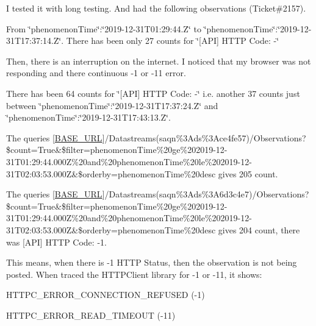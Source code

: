 \begin{DoxyEnumerate}
\item I tested it with long testing. And had the following observations (Ticket\#2157).
\begin{DoxyItemize}
\item From \char`\"{}phenomenon\+Time\char`\"{}\+:\char`\"{}2019-\/12-\/31\+T01\+:29\+:44.\+Z\char`\"{} to \char`\"{}phenomenon\+Time\char`\"{}\+:\char`\"{}2019-\/12-\/31\+T17\+:37\+:14.\+Z\char`\"{}. There has been only 27 counts for \char`\"{}\mbox{[}\+A\+P\+I\mbox{]} H\+T\+T\+P Code\+: -\/\char`\"{}
\item Then, there is an interruption on the internet. I noticed that my browser was not responding and there continuous -\/1 or -\/11 error.
\item There has been 64 counts for \char`\"{}\mbox{[}\+A\+P\+I\mbox{]} H\+T\+T\+P Code\+: -\/\char`\"{} i.\+e. another 37 counts just between \char`\"{}phenomenon\+Time\char`\"{}\+:\char`\"{}2019-\/12-\/31\+T17\+:37\+:24.\+Z\char`\"{} and \char`\"{}phenomenon\+Time\char`\"{}\+:\char`\"{}2019-\/12-\/31\+T17\+:43\+:13.\+Z\char`\"{}.
\item The queries \mbox{[}\mbox{\hyperlink{main_8h_acbb11c1e34784cf1e3147029f942bfd6}{B\+A\+S\+E\+\_\+\+U\+RL}}\mbox{]}/\+Datastreams(\textquotesingle{}saqn\%3Ads\%3Ace4fe57\textquotesingle{})/\+Observations?\$count=True\&\$filter=phenomenon\+Time\%20ge\%202019-\/12-\/31T01\+:29\+:44.\+000Z\%20and\%20phenomenon\+Time\%20le\%202019-\/12-\/31T02\+:03\+:53.\+000Z\&\$orderby=phenomenon\+Time\%20desc gives 205 count.
\item The queries \mbox{[}\mbox{\hyperlink{main_8h_acbb11c1e34784cf1e3147029f942bfd6}{B\+A\+S\+E\+\_\+\+U\+RL}}\mbox{]}/\+Datastreams(\textquotesingle{}saqn\%3Ads\%3A6d3c4e7\textquotesingle{})/\+Observations?\$count=True\&\$filter=phenomenon\+Time\%20ge\%202019-\/12-\/31T01\+:29\+:44.\+000Z\%20and\%20phenomenon\+Time\%20le\%202019-\/12-\/31T02\+:03\+:53.\+000Z\&\$orderby=phenomenon\+Time\%20desc gives 204 count, there was \mbox{[}A\+PI\mbox{]} H\+T\+TP Code\+: -\/1.
\item This means, when there is -\/1 H\+T\+TP Status, then the observation is not being posted. When traced the H\+T\+T\+P\+Client library for -\/1 or -\/11, it shows\+:
\begin{DoxyEnumerate}
\item H\+T\+T\+P\+C\+\_\+\+E\+R\+R\+O\+R\+\_\+\+C\+O\+N\+N\+E\+C\+T\+I\+O\+N\+\_\+\+R\+E\+F\+U\+S\+ED (-\/1)
\item H\+T\+T\+P\+C\+\_\+\+E\+R\+R\+O\+R\+\_\+\+R\+E\+A\+D\+\_\+\+T\+I\+M\+E\+O\+UT (-\/11)

\end{DoxyEnumerate}
\end{DoxyItemize}
\end{DoxyEnumerate}

